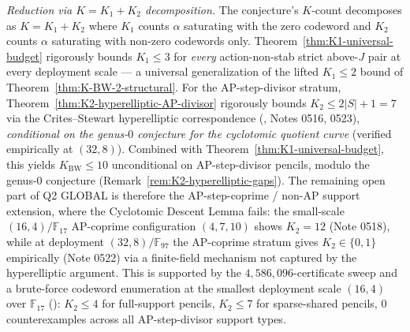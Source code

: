 \documentclass[11pt]{article}
\theoremstyle{definition}
\theoremstyle{remark}
\newcommand{\FF}{\mathbb{F}}
\begin{document}
\emph{Reduction via $K = K_1 + K_2$ decomposition.} The conjecture's
$K$-count decomposes as $K = K_1 + K_2$ where $K_1$ counts $\alpha$
saturating with the zero codeword and $K_2$ counts $\alpha$ saturating
with non-zero codewords only. Theorem~\ref{thm:K1-universal-budget}
rigorously bounds $K_1 \leq 3$ for \emph{every} action-non-stab strict
above-$J$ pair at every deployment scale --- a universal generalization
of the lifted $K_1 \leq 2$ bound of Theorem~\ref{thm:K-BW-2-structural}.
For the AP-step-divisor stratum,
Theorem~\ref{thm:K2-hyperelliptic-AP-divisor} rigorously bounds
$K_2 \leq 2|S| + 1 = 7$ via the Crites--Stewart hyperelliptic
correspondence (\cite{CompanionRepo}, Notes 0516, 0523),
\emph{conditional on the genus-$0$ conjecture for the cyclotomic
quotient curve} (verified empirically at $(32, 8)$). Combined with
Theorem~\ref{thm:K1-universal-budget}, this yields
$K_{\mathrm{BW}} \leq 10$ unconditional on AP-step-divisor pencils,
modulo the genus-$0$ conjecture
(Remark~\ref{rem:K2-hyperelliptic-gaps}). The remaining open part of
Q2 GLOBAL is therefore the AP-step-coprime / non-AP support extension,
where the Cyclotomic Descent Lemma fails:
the small-scale $(16, 4)/\FF_{17}$ AP-coprime configuration $(4, 7, 10)$
shows $K_2 = 12$ (Note 0518), while at deployment $(32, 8)/\FF_{97}$
the AP-coprime stratum gives $K_2 \in \{0, 1\}$ empirically (Note 0522)
via a finite-field mechanism not captured by the hyperelliptic
argument. This is supported by the $4{,}586{,}096$-certificate sweep
and a brute-force codeword enumeration at the smallest deployment
scale $(16, 4)$ over $\FF_{17}$ (\cite{CompanionRepo}):
$K_2 \leq 4$ for full-support pencils, $K_2 \leq 7$ for sparse-shared
pencils, $0$ counterexamples across all AP-step-divisor support types.
\end{document}
